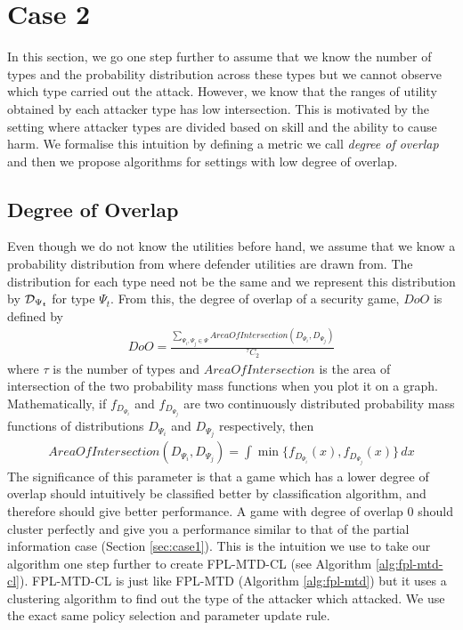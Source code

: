 \section{Case 2}\label{sec:case2}
In this section, we go one step further to assume that we know the number of types and the probability distribution across these types but we cannot observe which type carried out the attack. However, we know that the ranges of utility obtained by each attacker type has low intersection. This is motivated by the setting where attacker types are divided based on skill and the ability to cause harm. We formalise this intuition by defining a metric we call {\em degree of overlap} and then we propose algorithms for settings with low degree of overlap.
\subsection{Degree of Overlap}\label{subsec:doo}
Even though we do not know the utilities before hand, we assume that we know a probability distribution from where defender utilities are drawn from. The distribution for each type need not be the same and we represent this distribution by $\cal D_{\Psi_t}$ for type $\Psi_t$. From this, the degree of overlap of a security game, $DoO$ is defined by 
\begin{align*}
    DoO = \frac{\sum_{\Psi_i, \Psi_j \in \Psi}AreaOfIntersection(D_{\Psi_i}, D_{\Psi_j})}{^\tau C_2}
\end{align*}
where $\tau$ is the number of types and $AreaOfIntersection$ is the area of intersection of the two probability mass functions when you plot it on a graph. Mathematically, if $f_{D_{\Psi_i}}$ and $f_{D_{\Psi_j}}$ are two continuously distributed probability mass functions of distributions $D_{\Psi_i}$ and $D_{\Psi_j}$ respectively, then
\begin{align*}
    AreaOfIntersection(D_{\Psi_i}, D_{\Psi_j}) = \int \min\{f_{D_{\Psi_i}}(x), f_{D_{\Psi_j}}(x)\} \,dx
\end{align*}
The significance of this parameter is that a game which has a lower degree of overlap should intuitively be classified better by classification algorithm, and therefore should give better performance. A game with degree of overlap 0 should cluster perfectly and give you a performance similar to that of the partial information case (Section \ref{sec:case1}). This is the intuition we use to take our algorithm one step further to create FPL-MTD-CL (see Algorithm \ref{alg:fpl-mtd-cl}).
FPL-MTD-CL is just like FPL-MTD (Algorithm \ref{alg:fpl-mtd}) but it uses a clustering algorithm to find out the type of the attacker which attacked. We use the exact same policy selection and parameter update rule.
